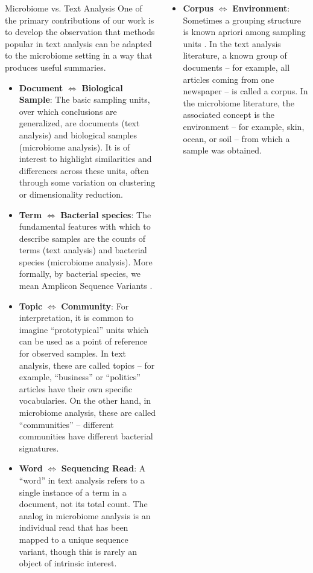 \documentclass[final]{beamer}
\newlength{\onecolwid}
\begin{document}
\begin{frame}
\begin{columns}
\begin{column}{\onecolwid}

\begin{block}{Microbiome vs. Text Analysis}
One of the primary contributions of our work is to develop the observation that
methods popular in text analysis can be adapted to the microbiome setting in a
way that produces useful summaries.

\begin{itemize}
  \item \textbf{Document} $\iff$ \textbf{Biological Sample}: The basic sampling
    units, over which conclusions are generalized, are documents (text analysis)
    and biological samples (microbiome analysis). It is of interest to highlight
    similarities and differences across these units, often through some
    variation on clustering or dimensionality reduction.
  \item \textbf{Term} $\iff$ \textbf{Bacterial species}: The fundamental
    features with which to describe samples are the counts of terms (text
    analysis) and bacterial species (microbiome analysis). More formally, by
    bacterial species, we mean Amplicon Sequence Variants
    \citep{callahan2017exact}.
  \item \textbf{Topic} $\iff$ \textbf{Community}: For interpretation, it is
    common to imagine ``prototypical'' units which can be used as a point of
    reference for observed samples. In text analysis, these are called topics --
    for example, ``business'' or ``politics'' articles have their own specific
    vocabularies. On the other hand, in microbiome analysis, these are called
    ``communities'' -- different communities have different bacterial
    signatures.
  \item \textbf{Word} $\iff$ \textbf{Sequencing Read}: A ``word'' in text analysis refers
    to a single instance of a term in a document, not its total count. The
    analog in microbiome analysis is an individual read that has been mapped to
    a unique sequence variant, though this is rarely an object of intrinsic interest.
\end{itemize}
\end{block}
\end{column}

\begin{column}{\onecolwid}
\begin{block}{ }
\begin{itemize}
  \item \textbf{Corpus} $\iff$ \textbf{Environment}: Sometimes a grouping
    structure is known apriori among sampling units \citep{teh2004sharing}. In
    the text analysis literature, a known group of documents -- for example, all
    articles coming from one newspaper -- is called a corpus. In the microbiome
    literature, the associated concept is the environment -- for example, skin,
    ocean, or soil -- from which a sample was obtained.
\end{itemize}
\end{block}


\end{column}
\end{columns}
\end{frame}
\end{document}
